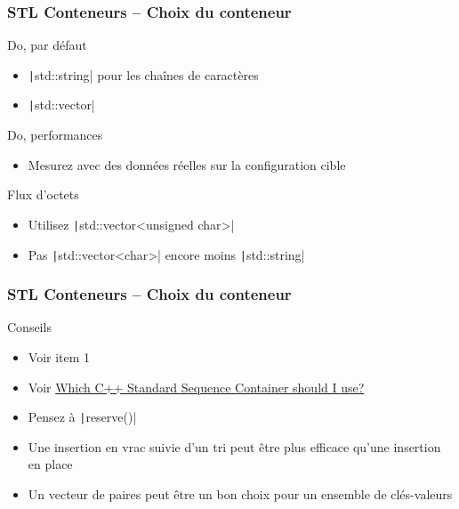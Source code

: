 \documentclass[C++.tex]{subfiles}
\begin{document}
\begin{frame}[fragile]
	\frametitle{STL Conteneurs -- Choix du conteneur}
	\begin{exampleblock}{Do, par défaut}
		\begin{itemize}
			\item \texttt|std::string| pour les chaînes de caractères
			\item \texttt|std::vector|
		\end{itemize}
	\end{exampleblock}		

	\begin{exampleblock}{Do, performances}
		\begin{itemize}
			\item Mesurez avec des données réelles sur la configuration cible
		\end{itemize}
	\end{exampleblock}

	\begin{alertblock}{Flux d'octets}
		\begin{itemize}
			\item Utilisez \texttt|std::vector<unsigned char>|
			\item Pas \texttt|std::vector<char>| encore moins \texttt|std::string|
		\end{itemize}
	\end{alertblock}
\end{frame}

\begin{frame}[fragile]
	\frametitle{STL Conteneurs -- Choix du conteneur}
	\begin{block}{Conseils}
		\begin{itemize}
			\item Voir \cite{effStl} item 1
			\item Voir \href{https://hackingcpp.com/cpp/design/which_std_sequence_container.png}{Which C++ Standard Sequence Container should I use?\linklogo}
			\item Pensez à \texttt|reserve()|
			\item Une insertion en vrac suivie d'un tri peut être plus efficace qu'une insertion en place


			\item Un vecteur de paires peut être un bon choix pour un ensemble de clés-valeurs
		\end{itemize}
	\end{block}
\end{frame}
\end{document}
